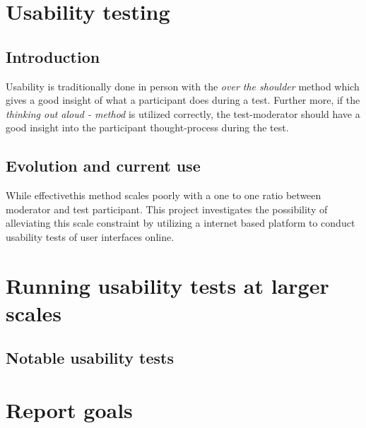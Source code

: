 \documentclass[nofilelist,dvipsnames]{cslthse-msc}
\begin{document}

  \section{Usability testing}

    \subsection{Introduction}

      Usability is traditionally done in person with the \textit{over the
        shoulder} method which gives a good insight of what a participant does
      during a test. Further more, if the \textit{thinking out aloud - method} is
      utilized correctly, the test-moderator should have a good insight into the
      participant thought-process during the test.

    \subsection{Evolution and current use}

      While effective\checkTruth this method scales poorly with a one to one ratio
      between moderator and test participant. This project investigates the
      possibility of alleviating this scale constraint by utilizing a internet
      based platform to conduct usability tests of user interfaces online.


%

  \section{Running usability tests at larger scales}

    \subsection{Notable usability tests}


	\section{Report goals}
\end{document}
